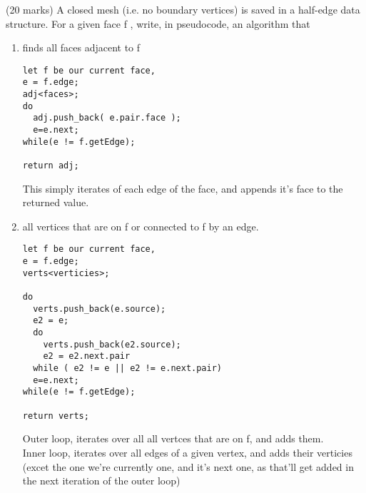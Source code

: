 (20 marks) A closed mesh (i.e. no boundary vertices) is saved in a half-edge data structure. For a given face f , write, in pseudocode, an algorithm that

\begin{enumerate}
\item finds all faces adjacent to f \\
\begin{verbatim}
let f be our current face,
e = f.edge;
adj<faces>;
do
  adj.push_back( e.pair.face );
  e=e.next;
while(e != f.getEdge);

return adj;
\end{verbatim}
This simply iterates of each edge of the face, and appends it's face to the returned value.\\
\item all vertices that are on f or connected to f by an edge. \\
\begin{verbatim}
let f be our current face,
e = f.edge;
verts<verticies>;

do
  verts.push_back(e.source);
  e2 = e;
  do
    verts.push_back(e2.source);
    e2 = e2.next.pair
  while ( e2 != e || e2 != e.next.pair)
  e=e.next;
while(e != f.getEdge);

return verts;
\end{verbatim}
Outer loop, iterates over all all vertces that are on f, and adds them. \\
Inner loop, iterates over all edges of a given vertex, and adds their verticies (excet the one we're currently one, and it's next one, as that'll get added in the next iteration of the outer loop)
\end{enumerate}
